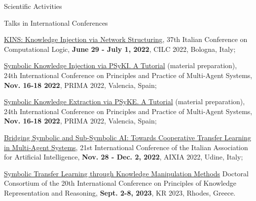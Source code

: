 \documentclass{resume} %
\begin{document}
\begin{rSection}{Scientific Activities}

        \begin{rSubsection}{Talks in International Conferences}{}{}{}
            \item \href{https://apice.unibo.it/xwiki/bin/view/Talk/KinsCilc2022}{KINS: Knowledge Injection via Network Structuring}, 37th Italian Conference on Computational Logic, \textbf{June 29 - July 1, 2022}, CILC 2022, Bologna, Italy;
            \item \href{https://apice.unibo.it/xwiki/bin/view/Talk/PsykitutorialPrima2022}{Symbolic Knowledge Injection via PSyKI. A Tutorial} (material preparation), 24th International Conference on Principles and Practice of Multi-Agent Systems, \textbf{Nov. 16-18 2022}, PRIMA 2022, Valencia, Spain;
            \item \href{https://apice.unibo.it/xwiki/bin/view/Talk/PsykiPrima2022}{Symbolic Knowledge Extraction via PSyKE. A Tutorial} (material preparation), 24th International Conference on Principles and Practice of Multi-Agent Systems, \textbf{Nov. 16-18 2022}, PRIMA 2022, Valencia, Spain;
            \item \href{https://apice.unibo.it/xwiki/bin/view/Talk/CtlAixia2022}{Bridging Symbolic and Sub-Symbolic AI: Towards Cooperative Transfer Learning in Multi-Agent Systems}, 21st International Conference of the Italian Association for Artificial Intelligence, \textbf{Nov. 28 - Dec. 2, 2022}, AIXIA 2022, Udine, Italy;
            \item \href{https://apice.unibo.it/xwiki/bin/view/Talk/SymbolicTransferLearning}{Symbolic Transfer Learning through Knowledge Manipulation Methods} Doctoral Consortium of the 20th International Conference on Principles of Knowledge Representation and Reasoning, \textbf{Sept. 2-8, 2023}, KR 2023, Rhodes, Greece.
        \end{rSubsection}


\end{rSection}
\end{document}

